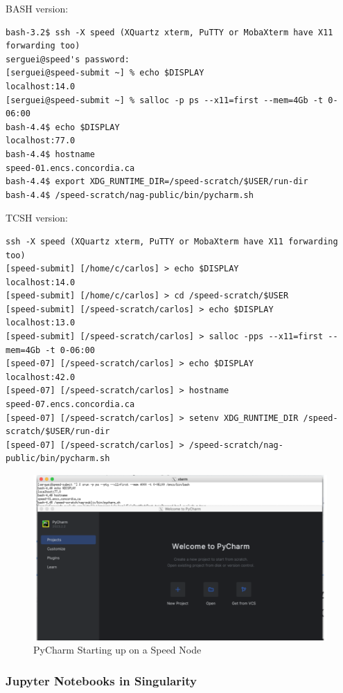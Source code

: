 BASH version:

\scriptsize
\begin{verbatim}
bash-3.2$ ssh -X speed (XQuartz xterm, PuTTY or MobaXterm have X11 forwarding too)
serguei@speed's password: 
[serguei@speed-submit ~] % echo $DISPLAY
localhost:14.0
[serguei@speed-submit ~] % salloc -p ps --x11=first --mem=4Gb -t 0-06:00 
bash-4.4$ echo $DISPLAY
localhost:77.0
bash-4.4$ hostname
speed-01.encs.concordia.ca
bash-4.4$ export XDG_RUNTIME_DIR=/speed-scratch/$USER/run-dir
bash-4.4$ /speed-scratch/nag-public/bin/pycharm.sh
\end{verbatim}
\normalsize

TCSH version:
\scriptsize
\begin{verbatim}
ssh -X speed (XQuartz xterm, PuTTY or MobaXterm have X11 forwarding too)
[speed-submit] [/home/c/carlos] > echo $DISPLAY
localhost:14.0
[speed-submit] [/home/c/carlos] > cd /speed-scratch/$USER
[speed-submit] [/speed-scratch/carlos] > echo $DISPLAY
localhost:13.0
[speed-submit] [/speed-scratch/carlos] > salloc -pps --x11=first --mem=4Gb -t 0-06:00
[speed-07] [/speed-scratch/carlos] > echo $DISPLAY
localhost:42.0
[speed-07] [/speed-scratch/carlos] > hostname
speed-07.encs.concordia.ca
[speed-07] [/speed-scratch/carlos] > setenv XDG_RUNTIME_DIR /speed-scratch/$USER/run-dir
[speed-07] [/speed-scratch/carlos] > /speed-scratch/nag-public/bin/pycharm.sh
\end{verbatim}
\normalsize


\begin{figure}[htpb]
			\includegraphics[width=\columnwidth]{images/pycharm}
		\caption{PyCharm Starting up on a Speed Node}
	\label{fig:pycharm}
\end{figure}

\subsubsection{Jupyter Notebooks in Singularity}
\label{sect:jupyter}

